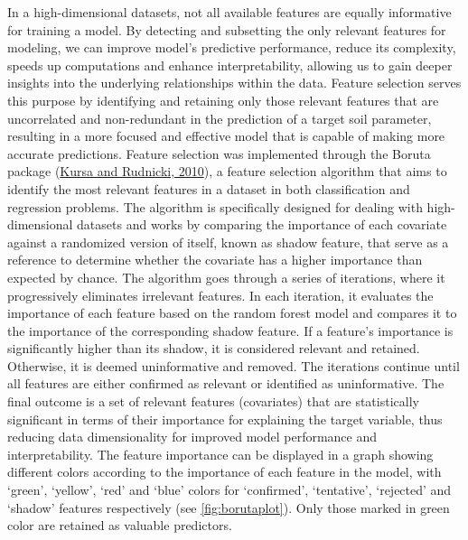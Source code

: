 \documentclass[
  10pt,
  b5paper,
  oneside]{book}
\begin{document}
In a high-dimensional datasets, not all available features are equally informative for training a model. By detecting and subsetting the only relevant features for modeling, we can improve model's predictive performance, reduce its complexity, speeds up computations and enhance interpretability, allowing us to gain deeper insights into the underlying relationships within the data. Feature selection serves this purpose by identifying and retaining only those relevant features that are uncorrelated and non-redundant in the prediction of a target soil parameter, resulting in a more focused and effective model that is capable of making more accurate predictions.
Feature selection was implemented through the Boruta package (\protect\hyperlink{ref-miron2010}{Kursa and Rudnicki, 2010}), a feature selection algorithm that aims to identify the most relevant features in a dataset in both classification and regression problems. The algorithm is specifically designed for dealing with high-dimensional datasets and works by comparing the importance of each covariate against a randomized version of itself, known as shadow feature, that serve as a reference to determine whether the covariate has a higher importance than expected by chance.
The algorithm goes through a series of iterations, where it progressively eliminates irrelevant features. In each iteration, it evaluates the importance of each feature based on the random forest model and compares it to the importance of the corresponding shadow feature. If a feature's importance is significantly higher than its shadow, it is considered relevant and retained. Otherwise, it is deemed uninformative and removed. The iterations continue until all features are either confirmed as relevant or identified as uninformative. The final outcome is a set of relevant features (covariates) that are statistically significant in terms of their importance for explaining the target variable, thus reducing data dimensionality for improved model performance and interpretability.
The feature importance can be displayed in a graph showing different colors according to the importance of each feature in the model, with `green', `yellow', `red' and `blue' colors for `confirmed', `tentative', `rejected' and `shadow' features respectively (see \ref{fig:borutaplot}). Only those marked in green color are retained as valuable predictors.
\end{document}
